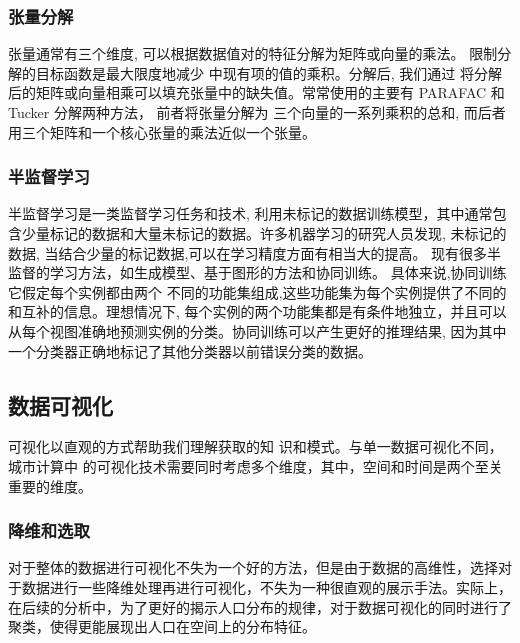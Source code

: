 \subsubsection*{张量分解}
张量通常有三个维度, 可以根据数据值对的特征分解为矩阵或向量的乘法。 限制分解的目标函数是最大限度地减少
中现有项的值的乘积。分解后, 我们通过
将分解后的矩阵或向量相乘可以填充张量中的缺失值。常常使用的主要有 PARAFAC\cite{bro1997parafac} 和 Tucker 分解\cite{kolda2009tensor}两种方法， 前者将张量分解为
三个向量的一系列乘积的总和, 而后者
用三个矩阵和一个核心张量的乘法近似一个张量。
\subsubsection*{半监督学习
}
半监督学习是一类监督学习任务和技术, 利用未标记的数据训练模型，其中通常包含少量标记的数据和大量未标记的数据。许多机器学习的研究人员发现, 未标记的数据, 当结合少量的标记数据,可以在学习精度方面有相当大的提高。 现有很多半监督的学习方法，如生成模型、基于图形的方法和协同训练。 具体来说,协同训练它假定每个实例都由两个
不同的功能集组成,这些功能集为每个实例提供了不同的和互补的信息。理想情况下, 每个实例的两个功能集都是有条件地独立，并且可以从每个视图准确地预测实例的分类。协同训练可以产生更好的推理结果, 因为其中一个分类器正确地标记了其他分类器以前错误分类的数据\cite{nigam2000analyzing}。\\

\subsection{数据可视化}
可视化以直观的方式帮助我们理解获取的知
识和模式。与单一数据可视化不同，城市计算中
的可视化技术需要同时考虑多个维度，其中，空间和时间是两个至关重要的维度\cite{zhengyu2015}。
\subsubsection*{降维和选取}
对于整体的数据进行可视化不失为一个好的方法，但是由于数据的高维性，选择对于数据进行一些降维处理再进行可视化，不失为一种很直观的展示手法。实际上，在后续的分析中，为了更好的揭示人口分布的规律，对于数据可视化的同时进行了聚类，使得更能展现出人口在空间上的分布特征。